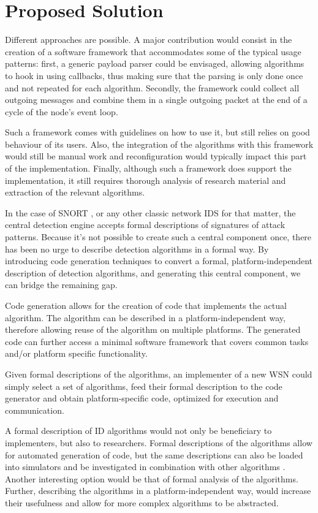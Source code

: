 \documentclass[conference]{IEEEtran}
\begin{document}
\section{Proposed Solution}
\label{section:solution}

Different approaches are possible. A major contribution would consist in the
creation of a software framework that accommodates some of the typical usage
patterns: first, a generic payload parser could be envisaged, allowing
algorithms to hook in using callbacks, thus making sure that the parsing is
only done once and not repeated for each algorithm. Secondly, the framework
could collect all outgoing messages and combine them in a single outgoing
packet at the end of a cycle of the node's event loop.

Such a framework comes with guidelines on how to use it, but still relies on
good behaviour of its users. Also, the integration of the algorithms with this
framework would still be manual work and reconfiguration would typically impact
this part of the implementation. Finally, although such a framework does
support the implementation, it still requires thorough analysis of research
material and extraction of the relevant algorithms.

In the case of SNORT \cite{roesch1999snort}, or any other classic network IDS
for that matter, the central detection engine accepts formal descriptions of
signatures of attack patterns. Because it's not possible to create such a
central component once, there has been no urge to describe detection algorithms
in a formal way. By introducing code generation techniques to convert a formal,
platform-independent description of detection algorithms, and generating this
central component, we can bridge the remaining gap.

Code generation allows for the creation of code that implements the actual
algorithm. The algorithm can be described in a platform-independent way,
therefore allowing reuse of the algorithm on multiple platforms. The generated
code can further access a minimal software framework that covers common tasks
and/or platform specific functionality.

Given formal descriptions of the algorithms, an implementer of a new WSN could
simply select a set of algorithms, feed their formal description to the code
generator and obtain platform-specific code, optimized for execution and
communication.

A formal description of ID algorithms would not only be beneficiary to
implementers, but also to researchers. Formal descriptions of the algorithms
allow for automated generation of code, but the same descriptions can also be
loaded into simulators and be investigated in combination with other algorithms
\cite{mernik2005and}. Another interesting option would be that of formal
analysis of the algorithms. Further, describing the algorithms in a
platform-independent way, would increase their usefulness and allow for more
complex algorithms to be abstracted.
\end{document}
